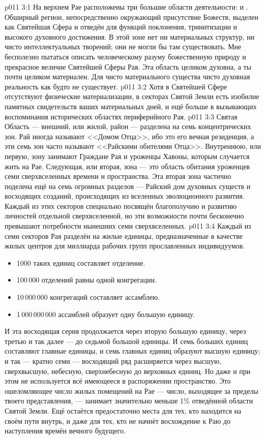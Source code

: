 \vs p011 3:1 На верхнем Рае расположены три большие области деятельности:   и . Обширный регион, непосредственно окружающий присутствие Божеств, выделен как Святейшая Сфера и отведён для функций поклонения, тринитизации и высокого духовного достижения. В этой зоне нет ни материальных структур, ни чисто интеллектуальных творений; они не могли бы там существовать. Мне бесполезно пытаться описать человеческому разуму божественную природу и прекрасное величие Святейшей Сферы Рая. Эта область целиком духовна, а ты почти целиком материален. Для чисто материального существа чисто духовная реальность как будто не существует.
\vs p011 3:2 Хотя в Святейшей Сфере отсутствуют физические материализации, в секторах Святой Земли есть изобилие памятных свидетельств ваших материальных дней, и ещё больше в вызывающих воспоминания исторических областях периферийного Рая.
\vs p011 3:3 Святая Область --- внешний, или жилой, район --- разделена на семь концентрических зон. Рай иногда называют <<Домом Отца>>, ибо это его вечная резиденция, а эти семь зон часто называют <<Райскими обителями Отца>>. Внутреннюю, или первую, зону занимают Граждане Рая и уроженцы Хавоны, которым случается жить на Рае. Следующая, или вторая, зона --- это область обитания уроженцев семи сверхвселенных времени и пространства. Эта вторая зона частично поделена ещё на семь огромных разделов --- Райский дом духовных существ и восходящих созданий, происходящих из вселенных эволюционного развития. Каждый из этих секторов специально посвящён благополучию и развитию личностей отдельной сверхвселенной, но эти возможности почти бесконечно превышают потребности нынешних семи сверхвселенных.
\vs p011 3:4 Каждый из семи секторов Рая разделён на жилые единицы, предназначенные в качестве жилых центров для миллиарда рабочих групп прославленных индивидуумов. \begin{itemize}\item 1000 таких единиц составляет отделение. \item 100\,000 отделений равны одной конгрегации. \item 10\,000\,000 конгрегаций составляет ассамблею. \item 1\,000\,000\,000 ассамблей образует одну большую единицу.\end{itemize} И эта восходящая серия продолжается через вторую большую единицу, через третью и так далее --- до седьмой большой единицы. И семь больших единиц составляют главные единицы, и семь главных единиц образуют высшую единицу; и так --- кратно семи --- восходящий ряд расширяется через высшую, сверхвысшую, небесную, сверхнебесную до верховных единиц. Но даже и при этом не используется всё имеющееся в распоряжении пространство. Это ошеломляющее число жилых помещений на Рае --- число, выходящее за пределы твоего представления, --- занимает значительно меньше 1\% отведённой области Святой Земли. Ещё остаётся предостаточно места для тех, кто находится на своём пути внутрь, и даже для тех, кто не начнёт восхождение к Раю до наступления времён вечного будущего.
